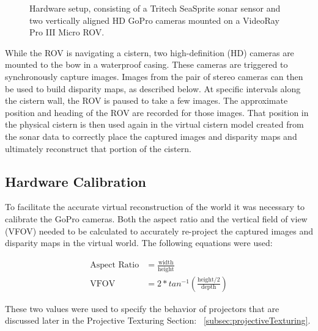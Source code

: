 \documentclass[a4paper,twoside]{article}
\begin{document}
\begin{figure}[!h]
   \vspace{-0.2cm}
   \caption{Hardware setup, consisting of a Tritech SeaSprite sonar sensor and two vertically aligned HD GoPro cameras mounted on a VideoRay Pro III Micro ROV.}
  \label{fig:ROV}
 \end{figure}

While the ROV is navigating a cistern, two high-definition (HD) cameras are mounted to the bow in a waterproof casing.
These cameras are triggered to synchronously capture images.  
Images from the pair of stereo cameras can then be used to build disparity maps, as described below.  
At specific intervals along the cistern wall, the ROV is paused to take a few images.  
The approximate position and heading of the ROV are recorded for those images.  
That position in the physical cistern is then used again in the virtual cistern model created from the sonar data to correctly place the captured images and disparity maps and ultimately reconstruct that portion of the cistern. 

\subsection{Hardware Calibration}
To facilitate the accurate virtual reconstruction of the world it was necessary to calibrate the GoPro cameras.
  Both the aspect ratio and the vertical field of view (VFOV) needed to be calculated to accurately re-project the captured images and disparity maps in the virtual world.  
The following equations were used:

\begin{align}
\text{Aspect Ratio} &= \frac{\text{width}}{\text{height}} \\
\text{VFOV} &= 2 * tan^{-1}(\frac{\text{height}/2}{\text{depth}})
\end{align}


These two values were used to specify the behavior of projectors that are discussed later in the Projective Texturing Section: ~\ref{subsec:projectiveTexturing}.
\end{document}
